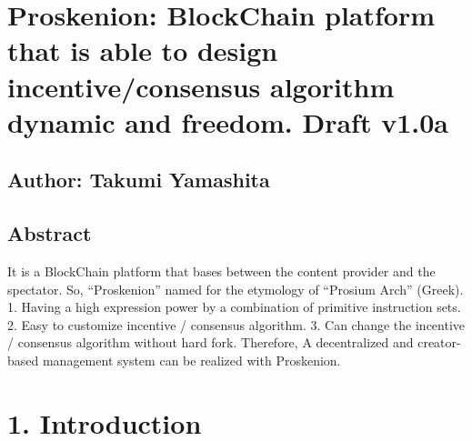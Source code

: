 \hypertarget{proskenion-blockchain-platform-that-is-able-to-design-incentiveconsensus-algorithm-dynamic-and-freedom.-draft-v1.0a}{%
\section{Proskenion: BlockChain platform that is able to design
incentive/consensus algorithm dynamic and freedom. Draft
v1.0a}\label{proskenion-blockchain-platform-that-is-able-to-design-incentiveconsensus-algorithm-dynamic-and-freedom.-draft-v1.0a}}

\hypertarget{author-takumi-yamashita}{%
\subsection{Author: Takumi Yamashita}\label{author-takumi-yamashita}}

\hypertarget{abstract}{%
\subsection{Abstract}\label{abstract}}

It is a BlockChain platform that bases between the content provider and
the spectator. So, ``Proskenion'' named for the etymology of ``Prosium
Arch'' (Greek). 1. Having a high expression power by a combination of
primitive instruction sets. 2. Easy to customize incentive / consensus
algorithm. 3. Can change the incentive / consensus algorithm without
hard fork. Therefore, A decentralized and creator-based management
system can be realized with Proskenion.

\hypertarget{introduction}{%
\section{1. Introduction}\label{introduction}}

